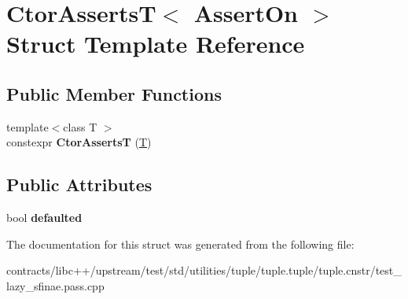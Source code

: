 \hypertarget{struct_ctor_asserts_t}{}\section{Ctor\+AssertsT$<$ Assert\+On $>$ Struct Template Reference}
\label{struct_ctor_asserts_t}
\subsection*{Public Member Functions}
\begin{DoxyCompactItemize}
\item 
\mbox{\label{struct_ctor_asserts_t_a8bd03ce956cf0f1e2e239a3a68dabde0}} 
{\footnotesize template$<$class T $>$ }\\constexpr {\bfseries Ctor\+AssertsT} (\mbox{\hyperlink{struct_t}{T}})
\end{DoxyCompactItemize}
\subsection*{Public Attributes}
\begin{DoxyCompactItemize}
\item 
\mbox{\label{struct_ctor_asserts_t_a34406de701796cebd5b0b93cd5a6cf8c}} 
bool {\bfseries defaulted}
\end{DoxyCompactItemize}


The documentation for this struct was generated from the following file\+:\begin{DoxyCompactItemize}
\item 
contracts/libc++/upstream/test/std/utilities/tuple/tuple.\+tuple/tuple.\+cnstr/test\+\_\+lazy\+\_\+sfinae.\+pass.\+cpp\end{DoxyCompactItemize}
